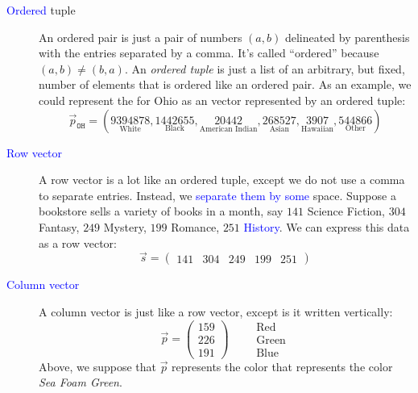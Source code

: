 \documentclass{ximera}
\begin{document}
\begin{concept}
\begin{description}
\item[\textcolor{blue}{Ordered} tuple] An ordered pair is just a pair of numbers
  $(a,b)$ delineated by parenthesis with the entries separated by a
  comma. It's called ``ordered'' because $(a,b) \ne (b,a)$. An \textit{ordered
  tuple} is just a list of an arbitrary, but fixed, number of elements
  that is ordered like an ordered pair. As an example, we could
  represent the  for Ohio as an vector
  represented by an ordered tuple:
  \[
  \vec{p}_{\texttt{OH}} = (\underset{\text{White}}{9394878},\underset{\text{Black}}{1442655},\underset{\text{American Indian}}{20442},\underset{\text{Asian}}{268527},\underset{\text{Hawaiian}}{3907},\underset{\text{Other}}{544866})
  \]
\item[\textcolor{blue}{Row vector}] A row vector is a lot like an ordered tuple,
  except we do not use a comma to separate entries. Instead, we \textcolor{blue}{separate them by some} space.  Suppose a bookstore sells a variety of books in a month, say
  $141$ Science Fiction,
  $304$ Fantasy,
  $249$ Mystery,
  $199$ Romance,
  $251$ \textcolor{blue}{History}.
  We can express this data as a row vector:
  \[
  \vec{s} = \begin{pmatrix}141 & 304 & 249 & 199 & 251 \end{pmatrix}
  \]
  \item[\textcolor{blue}{Column vector}] A column vector is just like a row vector,
  except is it written vertically:
  \[
  \vec{p} = \begin{pmatrix}
    159\\  226 \\ 191\end{pmatrix}
    \qquad
    \begin{array}{l}
    \text{Red}\\
    \text{Green}\\
    \text{Blue}
    \end{array}
  \]
  Above, we suppose that $\vec{p}$ represents the color that
  represents the color \textit{Sea Foam Green}.

\end{description}
\end{concept}
\end{document}
